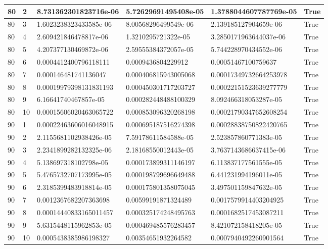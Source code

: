 \documentclass[a4paper, 12pt]{report}
\def\tabsize{4.4cm}
\def\stabsize{0.97cm}
\def\mtabsize{0.73cm}
\begin{document}
\begin{center}
\begin{longtable}{|m{\stabsize}|m{\stabsize}|m{\tabsize}|m{\tabsize}|m{\tabsize}|m{\mtabsize}|}
80 & 2 & 8.731362301823716e-06 & 5.72629691495408e-05 & 1.3788044607787769e-05 & True \\ \hline  
80 & 3 & 1.6023238323433585e-06 & 8.00568296499549e-06 & 2.139185127904659e-06 & True \\ \hline  
80 & 4 & 2.609421846478817e-06 & 1.3210295721322e-05 & 3.2850171963644037e-06 & True \\ \hline  
80 & 5 & 4.207377130469872e-06 & 2.59555384372057e-05 & 5.744228970434552e-06 & True \\ \hline  
80 & 6 & 0.0004412400796118111 & 0.0009436804229912 & 0.00051467100759637 & True \\ \hline  
80 & 7 & 0.000146481741136047 & 0.000406815943005068 & 0.00017349732664253978 & True \\ \hline  
80 & 8 & 0.00019979398131831193 & 0.000450301717203727 & 0.00022151523639277779 & True \\ \hline  
80 & 9 & 6.16641740467857e-05 & 0.000282448488100329 & 8.092466318053287e-05 & True \\ \hline  
80 & 10 & 0.00015606020463065722 & 0.000853096320268198 & 0.00021790347652608254 & True \\ \hline  
90 & 1 & 0.00022463606016048915 & 0.000695187516274398 & 0.00028838750822420765 & True \\ \hline  
90 & 2 & 2.1155681102938426e-05 & 7.59178611584588e-05 & 2.523857860771383e-05 & True \\ \hline  
90 & 3 & 2.2341899282132325e-06 & 2.18168550012443e-05 & 3.7637143686637415e-06 & True \\ \hline  
90 & 4 & 5.138697318102798e-05 & 0.000173899311146197 & 6.113837177561555e-05 & True \\ \hline  
90 & 5 & 5.4765732707173995e-05 & 0.000198799696649488 & 6.441231994196011e-05 & True \\ \hline  
90 & 6 & 2.3185399483918814e-05 & 0.000175801358075045 & 3.497501159847632e-05 & True \\ \hline  
90 & 7 & 0.0012367682207363698 & 0.00599191871324489 & 0.0017579914403204925 & True \\ \hline  
90 & 8 & 0.00014440833165011457 & 0.000325174248495763 & 0.0001682517453087211 & True \\ \hline  
90 & 9 & 5.6315448115962853e-05 & 0.000469485576283457 & 8.421072158418205e-05 & True \\ \hline  
90 & 10 & 0.0005438385986198327 & 0.00354651932264582 & 0.0007940492260901564 & True \\ \hline  

\end{longtable}
\end{center}
\end{document}
